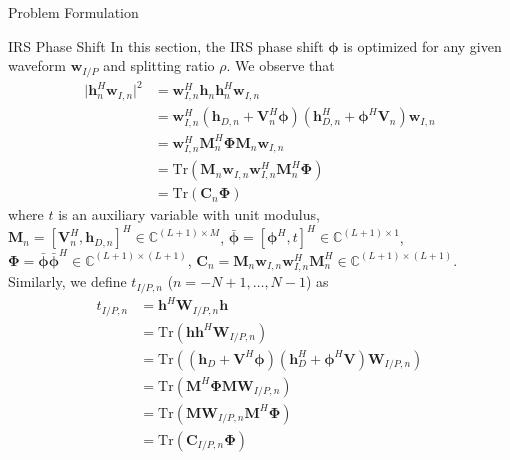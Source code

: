 \documentclass[journal]{IEEEtran}
\begin{document}
\begin{section}{Problem Formulation}
	\begin{subsection}{IRS Phase Shift}
		In this section, the IRS phase shift $\boldsymbol{\phi}$ is optimized for any given waveform $\boldsymbol{w}_{I/P}$ and splitting ratio $\rho$. We observe that
		\begin{equation}
			\begin{split}
				\lvert \boldsymbol{h}_{n}^H\boldsymbol{w}_{I,n} \rvert^2
				& = \boldsymbol{w}_{I,n}^H\boldsymbol{h}_n\boldsymbol{h}_n^H\boldsymbol{w}_{I,n}\\
				& = \boldsymbol{w}_{I,n}^H(\boldsymbol{h}_{D,n}+\boldsymbol{V}_n^H\boldsymbol{\phi})(\boldsymbol{h}_{D,n}^H+\boldsymbol{\phi}^H\boldsymbol{V}_n)\boldsymbol{w}_{I,n}\\
				& = \boldsymbol{w}_{I,n}^H\boldsymbol{M}_n^H\boldsymbol{\Phi}\boldsymbol{M}_n\boldsymbol{w}_{I,n}\\
				& = \mathrm{Tr}(\boldsymbol{M}_n\boldsymbol{w}_{I,n}\boldsymbol{w}_{I,n}^H\boldsymbol{M}_n^H\boldsymbol{\Phi})\\
				& = \mathrm{Tr}(\boldsymbol{C}_n\boldsymbol{\Phi})
			\end{split}
		\end{equation}
		where $t$ is an auxiliary variable with unit modulus, $\boldsymbol{M}_n=[\boldsymbol{V}_n^H, \boldsymbol{h}_{D,n}]^H \in \mathbb{C}^{(L+1) \times M}$, $\bar{\boldsymbol{\phi}}=[\boldsymbol{\phi}^H, t]^H \in \mathbb{C}^{(L+1) \times 1}$, $\boldsymbol{\Phi}=\bar{\boldsymbol{\phi}}\bar{\boldsymbol{\phi}}^H \in \mathbb{C}^{(L+1) \times (L+1)}$, $\boldsymbol{C}_n = \boldsymbol{M}_n\boldsymbol{w}_{I,n}\boldsymbol{w}_{I,n}^H\boldsymbol{M}_n^H \in \mathbb{C}^{(L+1)\times(L+1)}$. Similarly, we define $t_{I/P,n}$ ($n=-N+1,\dots,N-1$) as
		\begin{equation}
			\begin{split}
				t_{I/P,n}
				& = \boldsymbol{h}^H\boldsymbol{W}_{I/P,n}\boldsymbol{h}\\
				& = \mathrm{Tr}(\boldsymbol{h}\boldsymbol{h}^H\boldsymbol{W}_{I/P,n})\\
				& = \mathrm{Tr}\left((\boldsymbol{h}_{D}+\boldsymbol{V}^H\boldsymbol{\phi})(\boldsymbol{h}_{D}^H+\boldsymbol{\phi}^H\boldsymbol{V})\boldsymbol{W}_{I/P,n}\right)\\
				& = \mathrm{Tr}(\boldsymbol{M}^H\boldsymbol{\Phi}\boldsymbol{M}\boldsymbol{W}_{I/P,n})\\
				& = \mathrm{Tr}(\boldsymbol{M}\boldsymbol{W}_{I/P,n}\boldsymbol{M}^H\boldsymbol{\Phi})\\
				& = \mathrm{Tr}(\boldsymbol{C}_{I/P,n}\boldsymbol{\Phi})

\end{split}
\end{equation}
\end{subsection}
\end{section}
\end{document}
